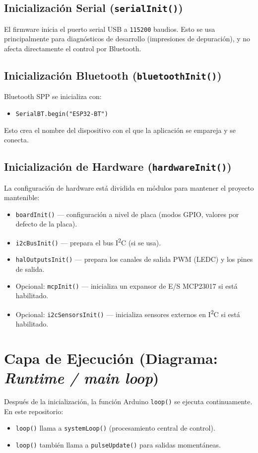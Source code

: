 \subsection{Inicialización Serial (\texttt{serialInit()})}
El firmware inicia el puerto serial USB a \texttt{115200} baudios.
Esto se usa principalmente para diagnósticos de desarrollo (impresiones de depuración), y no afecta directamente el control por Bluetooth.

\subsection{Inicialización Bluetooth (\texttt{bluetoothInit()})}
Bluetooth SPP se inicializa con:
\begin{itemize}
    \item \verb|SerialBT.begin("ESP32-BT")|
\end{itemize}
Esto crea el nombre del dispositivo con el que la aplicación se empareja y se conecta.

\subsection{Inicialización de Hardware (\texttt{hardwareInit()})}
La configuración de hardware está dividida en módulos para mantener el proyecto mantenible:

\begin{itemize}
    \item \texttt{boardInit()} --- configuración a nivel de placa (modos GPIO, valores por defecto de la placa).
    \item \texttt{i2cBusInit()} --- prepara el bus I\textsuperscript{2}C (si se usa).
    \item \texttt{halOutputsInit()} --- prepara los canales de salida PWM (LEDC) y los pines de salida.
    \item Opcional: \texttt{mcpInit()} --- inicializa un expansor de E/S MCP23017 si está habilitado.
    \item Opcional: \texttt{i2cSensorsInit()} --- inicializa sensores externos en I\textsuperscript{2}C si está habilitado.
\end{itemize}

\section{Capa de Ejecución (Diagrama: \textit{Runtime / main loop})}

Después de la inicialización, la función Arduino \texttt{loop()} se ejecuta continuamente.
En este repositorio:
\begin{itemize}
    \item \texttt{loop()} llama a \texttt{systemLoop()} (procesamiento central de control).
    \item \texttt{loop()} también llama a \texttt{pulseUpdate()} para salidas momentáneas.
\end{itemize}

